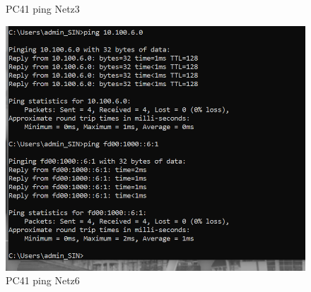 \documentclass{article}
\begin{document}
\begin{figure}[!htp]
\begin{minipage}[b]{0.25\textwidth}
    \caption{PC41 ping Netz3}
  \end{minipage}
  \hspace{0.8cm}
  \begin{minipage}[b]{0.25\textwidth}
    \includegraphics[width=\textwidth]{Arbeitsergebnisse/PC41/pc41_ping_net6.png}
    \caption{PC41 ping Netz6}
  \end{minipage}
\end{figure}
\end{document}

